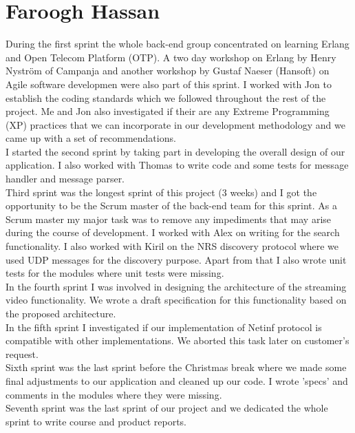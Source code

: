 \section{Faroogh Hassan}

During the first sprint the whole back-end group concentrated on learning Erlang and Open Telecom Platform (OTP). A two day workshop on Erlang by Henry Nyström of Campanja and another workshop by Gustaf Naeser (Hansoft) on Agile software developmen were also part of this sprint. I worked with Jon to establish the coding standards which we followed throughout the rest of the project. Me and Jon also investigated if their are any Extreme Programming (XP) practices that we can incorporate in our development methodology and we came up with a set of recommendations. \\

I started the second sprint by taking part in developing the overall design of our application. I also worked with Thomas to write code and some tests for message handler and message parser.\\

Third sprint was the longest sprint of this project (3 weeks) and I got the opportunity to be the Scrum master of the back-end team for this sprint. As a Scrum master my major task was to remove any impediments that may arise during the course of development. I worked with Alex on writing for the search functionality. I also worked with Kiril on the NRS discovery protocol where we used UDP messages for the discovery purpose. Apart from that I also wrote unit tests for the modules where unit tests were missing. \\

In the fourth sprint I was involved in designing the architecture of the streaming video functionality. We wrote a draft specification for this functionality based on the proposed architecture. \\

In the fifth sprint I investigated if our implementation of Netinf protocol is compatible with other implementations. We aborted this task later on customer's request. \\

Sixth sprint was the last sprint before the Christmas break where we made some final adjustments to our application and cleaned up our code. I wrote 'specs' and comments in the modules where they were missing. \\

Seventh sprint was the last sprint of our project and we dedicated the whole sprint to write course and product reports. \\